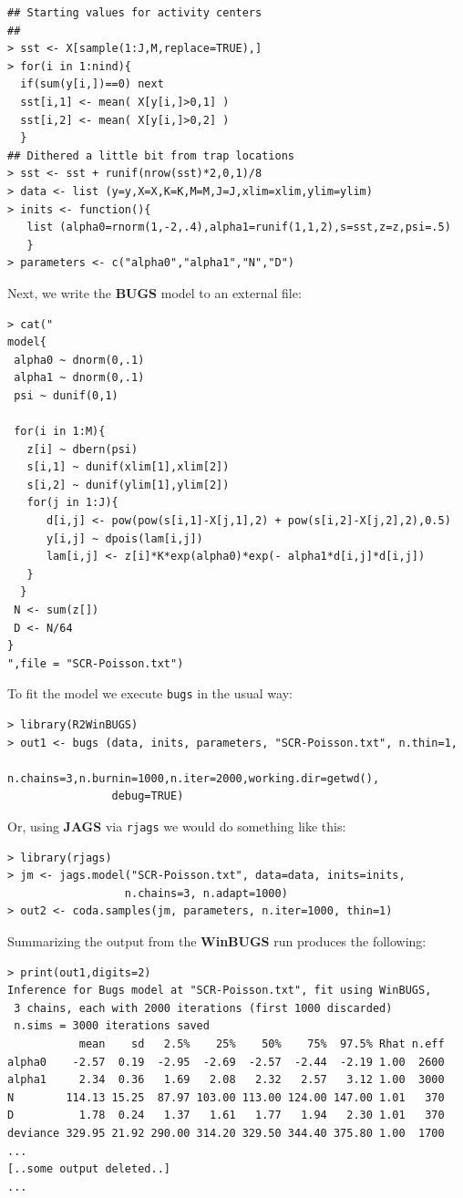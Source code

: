 {\small
\begin{verbatim}
## Starting values for activity centers
##
> sst <- X[sample(1:J,M,replace=TRUE),] 
> for(i in 1:nind){
  if(sum(y[i,])==0) next
  sst[i,1] <- mean( X[y[i,]>0,1] )
  sst[i,2] <- mean( X[y[i,]>0,2] )
  }
## Dithered a little bit from trap locations
> sst <- sst + runif(nrow(sst)*2,0,1)/8
> data <- list (y=y,X=X,K=K,M=M,J=J,xlim=xlim,ylim=ylim)
> inits <- function(){
   list (alpha0=rnorm(1,-2,.4),alpha1=runif(1,1,2),s=sst,z=z,psi=.5)
   }
> parameters <- c("alpha0","alpha1","N","D")
\end{verbatim}
}
Next, we write the {\bf BUGS} model to an external file:
{\small
\begin{verbatim}
> cat("
model{
 alpha0 ~ dnorm(0,.1)
 alpha1 ~ dnorm(0,.1)
 psi ~ dunif(0,1)

 for(i in 1:M){
   z[i] ~ dbern(psi)
   s[i,1] ~ dunif(xlim[1],xlim[2])
   s[i,2] ~ dunif(ylim[1],ylim[2])
   for(j in 1:J){
      d[i,j] <- pow(pow(s[i,1]-X[j,1],2) + pow(s[i,2]-X[j,2],2),0.5)
      y[i,j] ~ dpois(lam[i,j])
      lam[i,j] <- z[i]*K*exp(alpha0)*exp(- alpha1*d[i,j]*d[i,j])
   }
  }
 N <- sum(z[])
 D <- N/64
}
",file = "SCR-Poisson.txt")
\end{verbatim}
}
To fit the model we execute \mbox{\tt bugs} in the usual way:
{\small
\begin{verbatim}
> library(R2WinBUGS)
> out1 <- bugs (data, inits, parameters, "SCR-Poisson.txt", n.thin=1,
                n.chains=3,n.burnin=1000,n.iter=2000,working.dir=getwd(),
                debug=TRUE)
\end{verbatim}
}
{\flushleft Or, using {\bf JAGS} via \mbox{\tt rjags} we would do
  something like this:}
{\small
\begin{verbatim}
> library(rjags)
> jm <- jags.model("SCR-Poisson.txt", data=data, inits=inits,
                  n.chains=3, n.adapt=1000)
> out2 <- coda.samples(jm, parameters, n.iter=1000, thin=1)
\end{verbatim}
}
{\flushleft
Summarizing } the output from the {\bf WinBUGS}  run produces the following:
{\small
\begin{verbatim}
> print(out1,digits=2)
Inference for Bugs model at "SCR-Poisson.txt", fit using WinBUGS,
 3 chains, each with 2000 iterations (first 1000 discarded)
 n.sims = 3000 iterations saved
           mean    sd   2.5%    25%    50%    75%  97.5% Rhat n.eff
alpha0    -2.57  0.19  -2.95  -2.69  -2.57  -2.44  -2.19 1.00  2600
alpha1     2.34  0.36   1.69   2.08   2.32   2.57   3.12 1.00  3000
N        114.13 15.25  87.97 103.00 113.00 124.00 147.00 1.01   370
D          1.78  0.24   1.37   1.61   1.77   1.94   2.30 1.01   370
deviance 329.95 21.92 290.00 314.20 329.50 344.40 375.80 1.00  1700
...
[..some output deleted..]
...
\end{verbatim}
}


